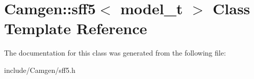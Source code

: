 \hypertarget{a00505}{}\section{Camgen\+:\+:sff5$<$ model\+\_\+t $>$ Class Template Reference}
\label{a00505}


The documentation for this class was generated from the following file\+:\begin{DoxyCompactItemize}
\item 
include/\+Camgen/sff5.\+h\end{DoxyCompactItemize}
